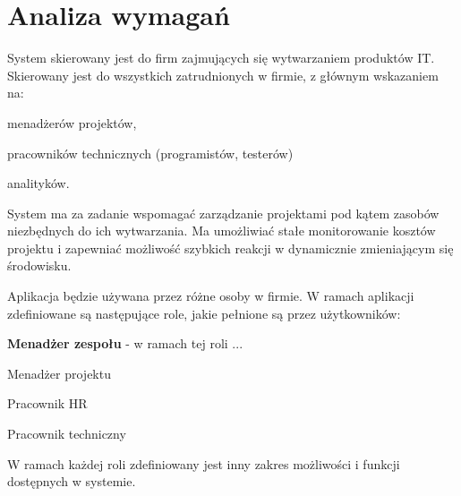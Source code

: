 \section{Analiza wymagań}
System skierowany jest do firm zajmujących się wytwarzaniem produktów IT. Skierowany jest do wszystkich zatrudnionych w firmie, z głównym wskazaniem na:
\begin{itemize*}
\item menadżerów projektów,
\item pracowników technicznych (programistów, testerów)
\item analityków.
\end{itemize*}

System ma za zadanie wspomagać zarządzanie projektami pod kątem zasobów niezbędnych do ich wytwarzania. Ma umożliwiać stałe monitorowanie kosztów projektu i zapewniać możliwość szybkich reakcji w dynamicznie zmieniającym się środowisku.




Aplikacja będzie używana przez różne osoby w firmie. W ramach aplikacji zdefiniowane są następujące role, jakie pełnione są przez użytkowników:
\begin{itemize*}
\item \textbf{Menadżer zespołu} - w ramach tej roli ...
\item Menadżer projektu
\item Pracownik HR
\item Pracownik techniczny
\end{itemize*}
W ramach każdej roli zdefiniowany jest inny zakres możliwości i funkcji dostępnych w systemie.

